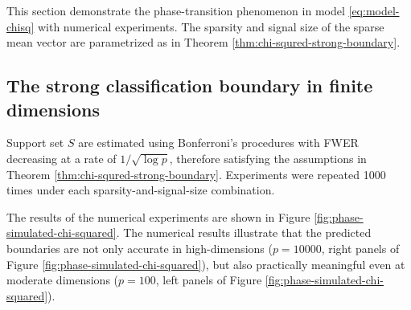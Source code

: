 This section demonstrate the phase-transition phenomenon in model \eqref{eq:model-chisq} with numerical experiments.
The sparsity and signal size of the sparse mean vector are parametrized as in Theorem \ref{thm:chi-squred-strong-boundary}.

\subsection{The strong classification boundary in finite dimensions}

Support set $S$ are estimated using Bonferroni's procedures with FWER decreasing at a rate of $1/\sqrt{\log{p}}$, therefore satisfying the assumptions in Theorem \ref{thm:chi-squred-strong-boundary}.
Experiments were repeated 1000 times under each sparsity-and-signal-size combination.

The results of the numerical experiments are shown in Figure \ref{fig:phase-simulated-chi-squared}.
The numerical results illustrate that the predicted boundaries are not only accurate in high-dimensions ($p=10000$, right panels of Figure \ref{fig:phase-simulated-chi-squared}), but also practically meaningful even at moderate dimensions ($p=100$, left panels of Figure \ref{fig:phase-simulated-chi-squared}).


